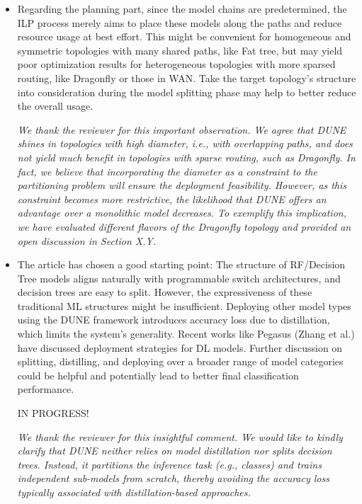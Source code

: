 \documentclass[10pt,compsoc,onecolumn,a4paper]{IEEEtran}
\newcommand{\eg}{\textnormal{e.g.},\xspace}
\begin{document}
\begin{itemize}

\vspace*{6pt}
\item[2.1] Regarding the planning part, since the model chains are predetermined, the ILP process merely aims to place these models along the paths and reduce resource usage at best effort. This might be convenient for homogeneous and symmetric topologies with many shared paths, like Fat tree, but may yield poor optimization results for heterogeneous topologies with more sparsed routing, like Dragonfly or those in WAN. Take the target topology's structure into consideration during the model splitting phase may help to better reduce the overall usage.

\vspace*{4pt}
{\it We thank the reviewer for this important observation.
We agree that DUNE shines in topologies with high diameter, i.e., with overlapping paths, and does not yield much benefit in topologies with sparse routing, such as Dragonfly.
In fact, we believe that incorporating the diameter as a constraint to the partitioning problem will ensure the deployment feasibility.
However, as this constraint becomes more restrictive, the likelihood that DUNE offers an advantage over a monolithic model decreases.
To exemplify this implication, we have evaluated different flavors of the Dragonfly topology and provided an open discussion in Section X.Y.
}

\vspace*{6pt}
\item[2.2] The article has chosen a good starting point: The structure of RF/Decision Tree models aligns naturally with programmable switch architectures, and decision trees are easy to split. However, the expressiveness of these traditional ML structures might be insufficient. Deploying other model types using the DUNE framework introduces accuracy loss due to distillation, which limits the system's generality. Recent works like Pegasus (Zhang et al.) have discussed deployment strategies for DL models. Further discussion on splitting, distilling, and deploying over a broader range of model categories could be helpful and potentially lead to better final classification performance.

\vspace*{4pt}
IN PROGRESS!

{\it We thank the reviewer for this insightful comment.  
We would like to kindly clarify that DUNE neither relies on model distillation nor splits decision trees. Instead, it partitions the inference task (\eg classes) and trains independent sub-models from scratch, thereby avoiding the accuracy loss typically associated with distillation-based approaches.

}
\end{itemize}
\end{document}
